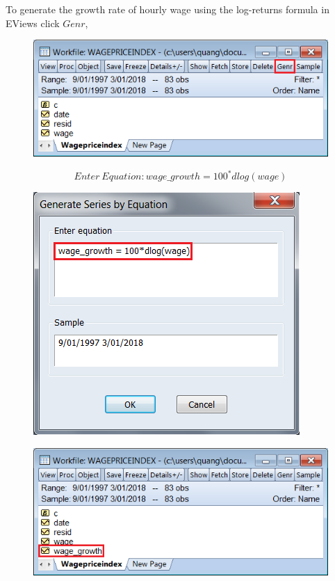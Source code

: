 \documentclass[12pt]{report}
\begin{document}
\noindent To generate the growth rate of hourly wage using the log-returns formula in EViews click $Genr$,
\begin{figure}[H]
	\centerline{\includegraphics{2018sem2_q2_7}}
\end{figure}
\vspace{-\baselineskip}
$$Enter\ Equation: wage\_growth = 100^*dlog(wage)$$
\begin{figure}[H]
	\centerline{\includegraphics{2018sem2_q2_6}}
\end{figure}
\vspace{-\baselineskip}
\begin{figure}[H]
	\centerline{\includegraphics{2018sem2_q2_8}}
\end{figure}
\end{document}
